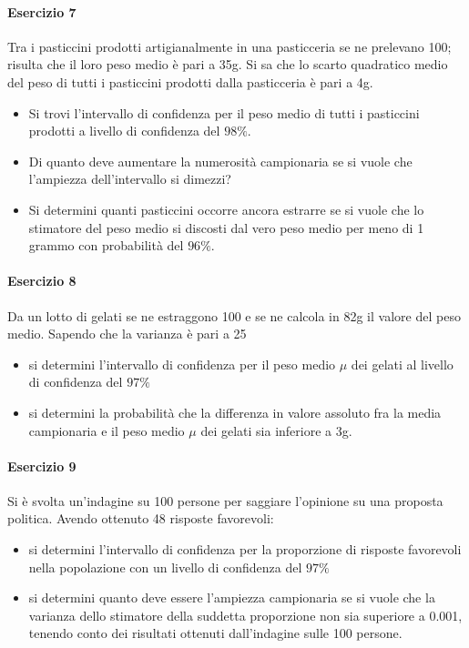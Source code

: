 \documentclass[12pt]{article}
\begin{document}
    \paragraph{Esercizio 7}
    Tra i pasticcini prodotti artigianalmente in una pasticceria se ne prelevano 100; risulta che il loro peso medio è pari a 35g. Si sa che lo scarto quadratico medio del peso di tutti i pasticcini prodotti dalla pasticceria è pari a 4g.
    \begin{itemize}
        \item Si trovi l’intervallo di confidenza per il peso medio di tutti i pasticcini prodotti a livello di confidenza del $98\%$.
        \item Di quanto deve aumentare la numerosità campionaria se si vuole che l’ampiezza dell’intervallo si dimezzi?
        \item Si determini quanti pasticcini occorre ancora estrarre se si vuole che lo stimatore del peso medio si discosti dal vero peso medio per meno di 1 grammo con probabilità del $96\%$.
    \end{itemize}
    \paragraph{Esercizio 8}
    Da un lotto di gelati se ne estraggono 100 e se ne calcola in 82g il valore del peso medio. Sapendo che la varianza è pari a 25
    \begin{itemize}
        \item si determini l'intervallo di confidenza per il peso medio $\mu$ dei gelati al livello di confidenza del $97\%$
        \item si determini la probabilità che la differenza in valore assoluto fra la media campionaria e il peso medio $\mu$ dei gelati sia inferiore a 3g.
    \end{itemize}
    \newpage
    \paragraph{Esercizio 9}
    Si è svolta un'indagine su 100 persone per saggiare l'opinione su una proposta politica. Avendo ottenuto 48 risposte favorevoli:
    \begin{itemize}
        \item si determini l'intervallo di confidenza per la proporzione di risposte favorevoli nella popolazione con un livello di confidenza del $97\%$
        \item si determini quanto deve essere l'ampiezza campionaria se si vuole che la varianza dello stimatore della suddetta proporzione non sia superiore a 0.001, tenendo conto dei risultati ottenuti dall'indagine sulle 100 persone.       
    \end{itemize}
\end{document}
